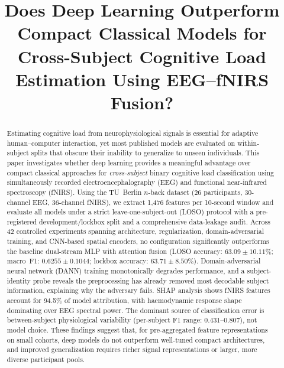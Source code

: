 \documentclass[conference]{IEEEtran}
\begin{document}
\title{Does Deep Learning Outperform Compact Classical Models for Cross-Subject Cognitive Load Estimation Using EEG--fNIRS Fusion?}

\author{
}

\maketitle

\begin{abstract}
Estimating cognitive load from neurophysiological signals is essential for adaptive human--computer interaction, yet most published models are evaluated on within-subject splits that obscure their inability to generalize to unseen individuals. This paper investigates whether deep learning provides a meaningful advantage over compact classical approaches for \emph{cross-subject} binary cognitive load classification using simultaneously recorded electroencephalography (EEG) and functional near-infrared spectroscopy (fNIRS). Using the TU~Berlin $n$-back dataset (26 participants, 30-channel EEG, 36-channel fNIRS), we extract 1{,}476 features per 10-second window and evaluate all models under a strict leave-one-subject-out (LOSO) protocol with a pre-registered development/lockbox split and a comprehensive data-leakage audit. Across 42 controlled experiments spanning architecture, regularization, domain-adversarial training, and CNN-based spatial encoders, no configuration significantly outperforms the baseline dual-stream MLP with attention fusion (LOSO accuracy: $63.09 \pm 10.11\%$; macro~F1: $0.6255 \pm 0.1044$; lockbox accuracy: $63.71 \pm 8.50\%$). Domain-adversarial neural network (DANN) training monotonically degrades performance, and a subject-identity probe reveals the preprocessing has already removed most decodable subject information, explaining why the adversary fails. SHAP analysis shows fNIRS features account for 94.5\% of model attribution, with haemodynamic response shape dominating over EEG spectral power. The dominant source of classification error is between-subject physiological variability (per-subject F1 range: 0.431--0.807), not model choice. These findings suggest that, for pre-aggregated feature representations on small cohorts, deep models do not outperform well-tuned compact architectures, and improved generalization requires richer signal representations or larger, more diverse participant pools.
\end{abstract}
\end{document}
